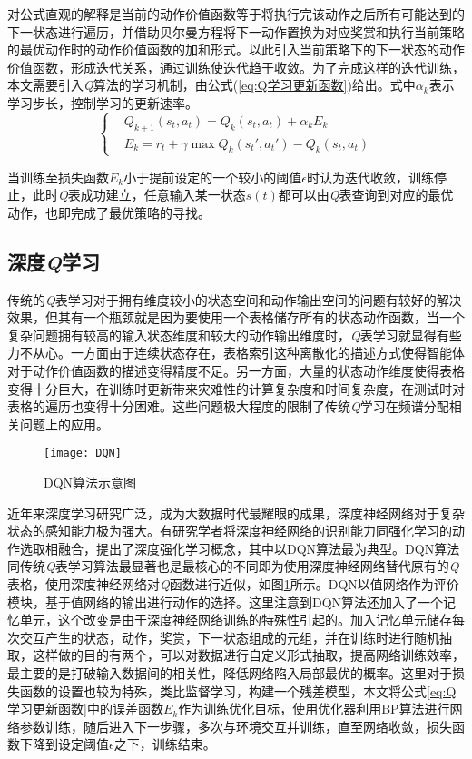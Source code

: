 对公式直观的解释是当前的动作价值函数等于将执行完该动作之后所有可能达到的下一状态进行遍历，并借助贝尔曼方程将下一动作置换为对应奖赏和执行当前策略的最优动作时的动作价值函数的加和形式。以此引入当前策略下的下一状态的动作价值函数，形成迭代关系，通过训练使迭代趋于收敛。为了完成这样的迭代训练，本文需要引入\textit{Q}算法的学习机制，由公式(\ref{eq:Q学习更新函数})给出。式中$\alpha_{k}$表示学习步长，控制学习的更新速率。
\begin{equation}\label{eq:Q学习更新函数}
\left\lbrace 
\begin{aligned}
&Q_{k+1}\left ( s_{t},a_{t} \right )=Q_{k}\left ( s_{t},a_{t} \right )+\alpha_{k}E_{k}\\
&E_{k}=r_{t}+\gamma\max Q_{k}\left ( {s_{t}}' ,{a_{t}}'\right )-Q_{k}\left ( s_{t},a_{t}\right )
\end{aligned}
\right.
\end{equation}

当训练至损失函数$E_{k}$小于提前设定的一个较小的阈值$\epsilon$时认为迭代收敛，训练停止，此时\textit{Q}表成功建立，任意输入某一状态$s(t)$都可以由\textit{Q}表查询到对应的最优动作，也即完成了最优策略的寻找。
\subsection{深度\textit{Q}学习}
传统的\textit{Q}表学习对于拥有维度较小的状态空间和动作输出空间的问题有较好的解决效果，但其有一个瓶颈就是因为要使用一个表格储存所有的状态动作函数，当一个复杂问题拥有较高的输入状态维度和较大的动作输出维度时，\textit{Q}表学习就显得有些力不从心。一方面由于连续状态存在，表格索引这种离散化的描述方式使得智能体对于动作价值函数的描述变得精度不足。另一方面，大量的状态动作维度使得表格变得十分巨大，在训练时更新带来灾难性的计算复杂度和时间复杂度，在测试时对表格的遍历也变得十分困难。这些问题极大程度的限制了传统\textit{Q}学习在频谱分配相关问题上的应用。
\begin{figure}[h]
	\centering
	\texttt{[image: DQN]}
	\caption{DQN算法示意图}
	\label{fig:DQN}
\end{figure}

近年来深度学习研究广泛，成为大数据时代最耀眼的成果，深度神经网络对于复杂状态的感知能力极为强大。有研究学者将深度神经网络的识别能力同强化学习的动作选取相融合，提出了深度强化学习\cite{mnih2013playing}概念，其中以DQN算法最为典型。DQN算法同传统\textit{Q}表学习算法最显著也是最核心的不同即为使用深度神经网络替代原有的\textit{Q}表格，使用深度神经网络对\textit{Q}函数进行近似，如图\ref{fig:DQN}所示。DQN以值网络作为评价模块，基于值网络的输出进行动作的选择。这里注意到DQN算法还加入了一个记忆单元，这个改变是由于深度神经网络训练的特殊性引起的。加入记忆单元储存每次交互产生的状态，动作，奖赏，下一状态组成的元组，并在训练时进行随机抽取，这样做的目的有两个，可以对数据进行自定义形式抽取，提高网络训练效率，最主要的是打破输入数据间的相关性，降低网络陷入局部最优的概率。这里对于损失函数的设置也较为特殊，类比监督学习，构建一个残差模型，本文将公式\ref{eq:Q学习更新函数}中的误差函数$E_{k}$作为训练优化目标，使用优化器利用BP算法进行网络参数训练，随后进入下一步骤，多次与环境交互并训练，直至网络收敛，损失函数下降到设定阈值$\epsilon$之下，训练结束。

